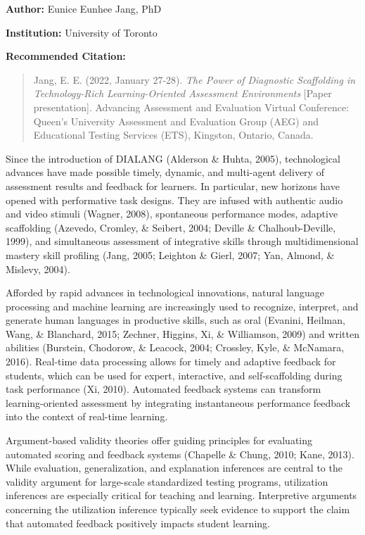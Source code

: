 \documentclass[
]{book}
\begin{document}
\textbf{Author:} Eunice Eunhee Jang, PhD

\textbf{Institution:} University of Toronto

\textbf{Recommended Citation:}

\begin{quote}
Jang, E. E. (2022, January 27-28). \emph{The Power of Diagnostic Scaffolding in Technology-Rich Learning-Oriented Assessment Environments} {[}Paper presentation{]}. Advancing Assessment and Evaluation Virtual Conference: Queen's University Assessment and Evaluation Group (AEG) and Educational Testing Services (ETS), Kingston, Ontario, Canada.
\end{quote}

Since the introduction of DIALANG (Alderson \& Huhta, 2005), technological advances have made possible timely, dynamic, and multi-agent delivery of assessment results and feedback for learners. In particular, new horizons have opened with performative task designs. They are infused with authentic audio and video stimuli (Wagner, 2008), spontaneous performance modes, adaptive scaffolding (Azevedo, Cromley, \& Seibert, 2004; Deville \& Chalhoub-Deville, 1999), and simultaneous assessment of integrative skills through multidimensional mastery skill profiling (Jang, 2005; Leighton \& Gierl, 2007; Yan, Almond, \& Mislevy, 2004).

Afforded by rapid advances in technological innovations, natural language processing and machine learning are increasingly used to recognize, interpret, and generate human languages in productive skills, such as oral (Evanini, Heilman, Wang, \& Blanchard, 2015; Zechner, Higgins, Xi, \& Williamson, 2009) and written abilities (Burstein, Chodorow, \& Leacock, 2004; Crossley, Kyle, \& McNamara, 2016). Real-time data processing allows for timely and adaptive feedback for students, which can be used for expert, interactive, and self-scaffolding during task performance (Xi, 2010). Automated feedback systems can transform learning-oriented assessment by integrating instantaneous performance feedback into the context of real-time learning.

Argument-based validity theories offer guiding principles for evaluating automated scoring and feedback systems (Chapelle \& Chung, 2010; Kane, 2013). While evaluation, generalization, and explanation inferences are central to the validity argument for large-scale standardized testing programs, utilization inferences are especially critical for teaching and learning. Interpretive arguments concerning the utilization inference typically seek evidence to support the claim that automated feedback positively impacts student learning.
\end{document}
